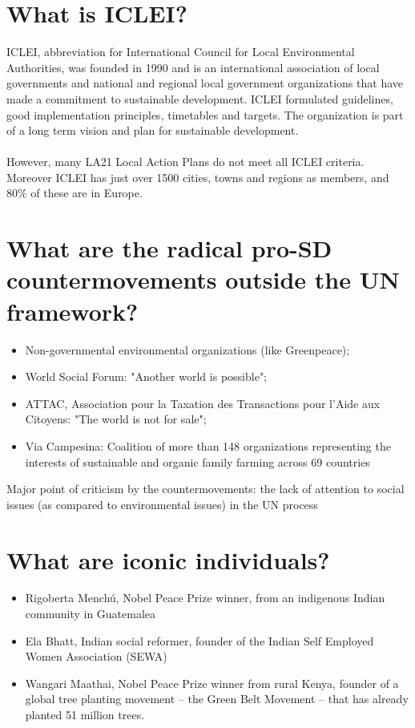 \section{What is ICLEI?}
ICLEI, abbreviation for International Council for Local Environmental Authorities, was founded in 1990 and is an international association of local governments and national and regional local government organizations that have made a commitment to sustainable development. ICLEI formulated guidelines, good implementation principles, timetables and targets. The organization is part of a long term vision and plan for sustainable development. \\
\\
However, many LA21 Local Action Plans do not meet all ICLEI criteria. Moreover ICLEI has just over 1500 cities, towns and regions as members, and 80\% of these are in Europe.

\section{What are the radical pro-SD countermovements outside the UN framework?}
\begin{itemize}
\item Non-governmental environmental organizations (like Greenpeace);
\item World Social Forum: "Another world is possible";
\item ATTAC, Association pour la Taxation des Transactions pour l'Aide aux Citoyens: "The world is not for sale";
\item Via Campesina: Coalition of more than 148 organizations representing the interests of sustainable and organic family farming across 69 countries 
\end{itemize} 

Major point of criticism by the countermovements: the lack of attention to social issues (as compared to environmental issues) in the UN process

\section{What are iconic individuals?}
\begin{itemize}
\item Rigoberta Menchú, Nobel Peace Prize winner, from an indigenous Indian community in Guatemalea
\item Ela Bhatt, Indian social reformer, founder of the Indian Self Employed Women Association (SEWA)
\item Wangari Maathai, Nobel Peace Prize winner from rural Kenya, founder of a global tree planting movement – the Green Belt Movement – that has already planted 51 million trees.
\end{itemize}

